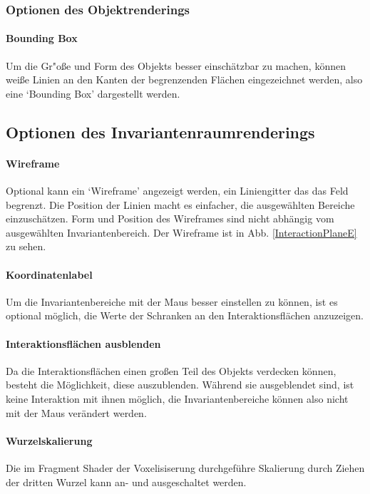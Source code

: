 \documentclass[a4paper,fontsize=12pt,toc=bib,halfparskip]{scrartcl}
\begin{document}
\subsubsection{Optionen des Objektrenderings}

\paragraph{Bounding Box}
Um die Gr"o{\ss}e und Form des Objekts besser einsch\"atzbar zu machen, k\"onnen wei{\ss}e Linien an den Kanten der begrenzenden Fl\"achen eingezeichnet werden, also eine `Bounding Box' dargestellt werden.

\subsection{Optionen des Invariantenraumrenderings}
\paragraph{Wireframe}
Optional kann ein `Wireframe' angezeigt werden, ein Liniengitter das das Feld begrenzt. Die Position der Linien macht es einfacher, die ausgew\"ahlten Bereiche einzusch\"atzen. Form und Position des Wireframes sind nicht abh\"angig vom ausgew\"ahlten Invariantenbereich. Der Wireframe ist in Abb. \ref{InteractionPlaneE} zu sehen.
\paragraph{Koordinatenlabel}
Um die Invariantenbereiche mit der Maus besser einstellen zu k\"onnen, ist es optional m\"oglich, die Werte der Schranken an den Interaktionsfl\"achen anzuzeigen.

\paragraph{Interaktionsfl\"achen ausblenden}
Da die Interaktionsfl\"achen einen gro{\ss}en Teil des Objekts verdecken k\"onnen, besteht die M\"oglichkeit, diese auszublenden. W\"ahrend sie ausgeblendet sind, ist keine Interaktion mit ihnen m\"oglich, die Invariantenbereiche k\"onnen also nicht mit der Maus ver\"andert werden.

\paragraph{Wurzelskalierung}
Die im Fragment Shader der Voxelisiserung durchgef\"uhre Skalierung durch Ziehen der dritten Wurzel kann an- und ausgeschaltet werden.
\end{document}
